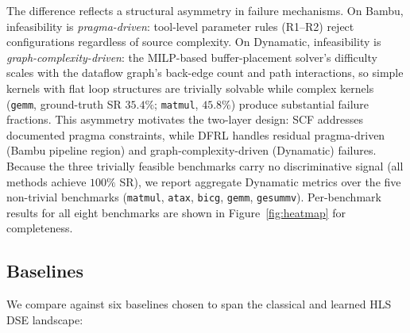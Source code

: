 \documentclass[journal]{IEEEtran}
\begin{document}
The difference reflects a structural asymmetry in failure mechanisms. On Bambu, infeasibility is \emph{pragma-driven}: tool-level parameter rules (R1--R2) reject configurations regardless of source complexity. On Dynamatic, infeasibility is \emph{graph-complexity-driven}: the MILP-based buffer-placement solver's difficulty scales with the dataflow graph's back-edge count and path interactions, so simple kernels with flat loop structures are trivially solvable while complex kernels (\texttt{gemm}, ground-truth SR $35.4\%$; \texttt{matmul}, $45.8\%$) produce substantial failure fractions. This asymmetry motivates the two-layer design: SCF addresses documented pragma constraints, while DFRL handles residual pragma-driven (Bambu pipeline region) and graph-complexity-driven (Dynamatic) failures. Because the three trivially feasible benchmarks carry no discriminative signal (all methods achieve $100\%$ SR), we report aggregate Dynamatic metrics over the five non-trivial benchmarks (\texttt{matmul}, \texttt{atax}, \texttt{bicg}, \texttt{gemm}, \texttt{gesummv}). Per-benchmark results for all eight benchmarks are shown in Figure~\ref{fig:heatmap} for completeness.

\subsection{Baselines}
\label{sec:baselines}

We compare against six baselines chosen to span the classical and learned HLS DSE landscape:
\end{document}
